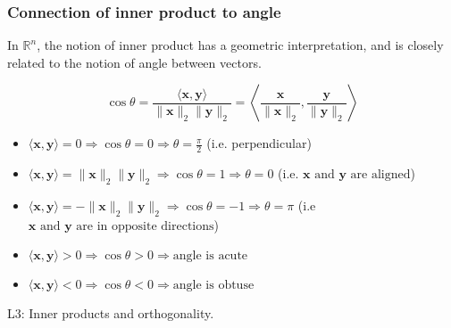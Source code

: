 \subsubsection{Connection of inner product to angle}
In $\mathbb{R}^n$, the notion of inner product has a geometric interpretation, and is closely related to the notion of angle between vectors. 
    \begin{definition}
        \begin{equation}
            \cos\theta = \frac{\langle \mathbf{x}, \mathbf{y} \rangle}{\|\mathbf{x}\|_2 \|\mathbf{y}\|_2} = \left\langle \frac{\mathbf{x}}{\|\mathbf{x}\|_2}, \frac{\mathbf{y}}{\|\mathbf{y}\|_2} \right\rangle
        \end{equation}
        \begin{itemize}
            \item $\langle \mathbf{x}, \mathbf{y} \rangle = 0 \Rightarrow \cos\theta = 0 \Rightarrow \theta = \frac{\pi}{2}$ (i.e. perpendicular)
            
            \item $\langle \mathbf{x}, \mathbf{y} \rangle = \|\mathbf{x}\|_2 \|\mathbf{y}\|_2 \Rightarrow \cos\theta = 1 \Rightarrow \theta = 0$ (i.e. $\mathbf{x} \text{ and } \mathbf{y} \text{ are aligned}$)
            
            \item $\langle \mathbf{x}, \mathbf{y} \rangle = - \|\mathbf{x}\|_2 \|\mathbf{y}\|_2 \Rightarrow \cos\theta = -1 \Rightarrow \theta = \pi$ (i.e $\mathbf{x} \text{ and } \mathbf{y} \text{ are in opposite directions}$)
            
            \item $\langle \mathbf{x}, \mathbf{y} \rangle > 0 \Rightarrow \cos\theta > 0 \Rightarrow \text{angle is acute}$
            
            \item $\langle \mathbf{x}, \mathbf{y} \rangle < 0 \Rightarrow \cos\theta < 0 \Rightarrow \text{angle is obtuse}$
        \end{itemize}
    \end{definition}

    \begin{derivation}
        L3: Inner products and orthogonality.
    \end{derivation}

